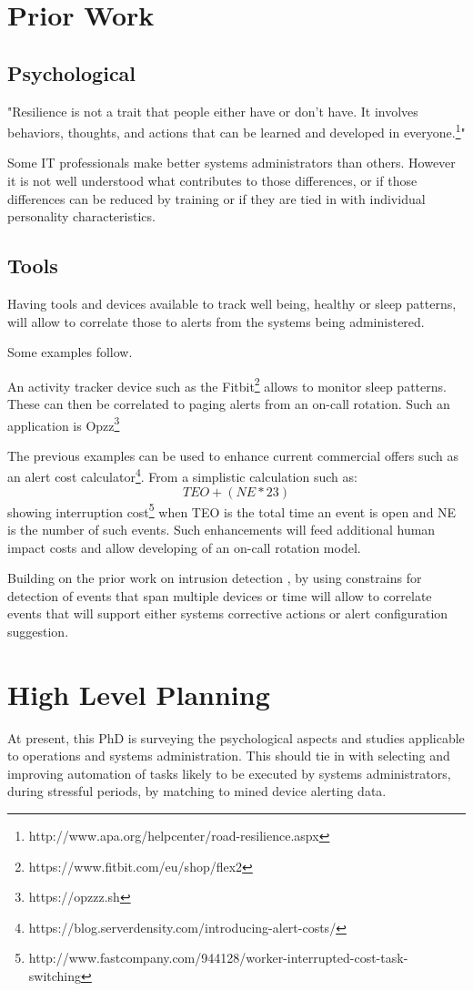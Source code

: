 \documentclass{llncs}
\begin{document}
\section{Prior Work}
%
\subsection{Psychological}
%
"Resilience is not a trait that people either have or don’t have. It involves behaviors, thoughts, and actions that can be learned and developed in everyone.\footnote{http://www.apa.org/helpcenter/road-resilience.aspx}"

Some IT professionals make better systems administrators than others. However it is not well understood what contributes to those differences, or if those differences can be reduced by training or if they are tied in with individual personality characteristics.
%
\subsection{Tools}
%
Having tools and devices available to track well being, healthy or sleep patterns, will allow to correlate those to alerts from the systems being administered.

Some examples follow.

An activity tracker device such as the Fitbit\footnote{https://www.fitbit.com/eu/shop/flex2} allows to monitor sleep patterns. These can then be correlated to paging alerts from an on-call rotation. Such an application is Opzz\footnote{https://opzzz.sh}

The previous examples can be used to enhance current commercial offers such as an alert cost calculator\footnote{https://blog.serverdensity.com/introducing-alert-costs/}. From a simplistic calculation such as:
\begin{equation}
TEO + (NE * 23)
\end{equation}
showing interruption cost\footnote{http://www.fastcompany.com/944128/worker-interrupted-cost-task-switching} when TEO is the total time an event is open and NE is the number of such events. Such enhancements will feed additional human impact costs and allow developing of an on-call rotation model.

Building on the prior work on intrusion detection \cite{ped:sal}, by using constrains for detection of events that span multiple devices or time will allow to correlate events that will support either systems corrective actions or alert configuration suggestion.
%
\section{High Level Planning}
%
At present, this PhD is surveying the psychological aspects and studies applicable to operations and systems administration. This should tie in with selecting and improving automation of tasks likely to be executed by systems administrators, during stressful periods, by matching to mined device alerting data.
\end{document}
